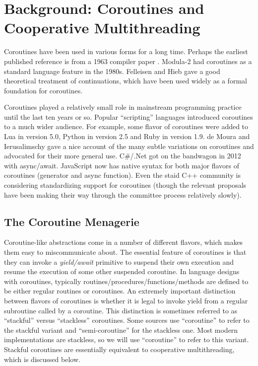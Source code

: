 \documentclass[a4paper,UKenglish,cleveref, autoref]{lipics-v2019}
\begin{document}
\section{Background: Coroutines and Cooperative Multithreading}

Coroutines have been used in various forms for a long time.
Perhaps the earliest published reference is from a 1963 compiler paper \cite{Conway1963}.
Modula-2 had coroutines as a standard language feature in the 1980s.
Felleisen and Hieb \cite{Felleisen1992} gave a good theoretical treatment of continuations, which have been used widely as a formal foundation for coroutines.

Coroutines played a relatively small role in mainstream programming practice until the last ten years or so.
Popular ``scripting'' languages introduced coroutines to a much wider audience.
For example, some flavor of coroutines were added to Lua in version 5.0, Python in version 2.5 and Ruby in version 1.9.
de Moura and Ierusalimschy \cite{Moura2009} gave a nice account of the many subtle variations on coroutines and advocated for their more general use.
C\#{\slash}.Net got on the bandwagon in 2012 with async{\slash}await.
JavaScript now has native syntax for both major flavors of coroutines (generator and async function).
Even the staid C++ community is considering standardizing support for coroutines (though the relevant proposals have been making their way through the committee process relatively slowly).

\subsection{The Coroutine Menagerie}

Coroutine-like abstractions come in a number of different flavors, which makes them easy to miscommunicate about.
The essential feature of coroutines is that they can invoke a \emph{yield{\slash}await} primitive to suspend their own execution and resume the execution of some other suspended coroutine.
In language designs with coroutines, typically routines{\slash}procedures{\slash}functions{\slash}methods are defined to be either regular routines or coroutines.
An extremely important distinction between flavors of coroutines is whether it is legal to invoke yield from a regular subroutine called by a coroutine.
This distinction is sometimes referred to as ``stackful'' versus ``stackless'' coroutines.
Some sources use ``coroutine'' to refer to the stackful variant and ``semi-coroutine'' for the stackless one.
Most modern implementations are stackless, so we will use ``coroutine'' to refer to this variant.
Stackful coroutines are essentially equivalent to cooperative multithreading, which is discussed below.
\end{document}
